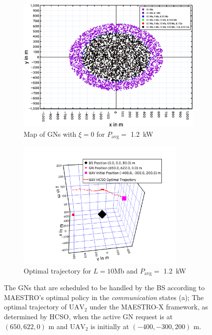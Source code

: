 \documentclass[12pt, draftcls, onecolumn]{IEEEtran}
\theoremstyle{plain}
\theoremstyle{definition}
\theoremstyle{remark}
\begin{document}
\begin{figure}
\centering
	\begin{subfigure}{0.49\textwidth}
  		\centering
  		\includegraphics[width=0.9\linewidth]{figs/GN_Distribution.png}
  		\caption{Map of GNs with $\xi{=}0$ for $P_{\mathrm{avg}}=$ \qty[mode=text]{1.2}{\kilo\watt}}
  		\label{F9}
	\end{subfigure}
	\begin{subfigure}{0.49\textwidth}
  		\centering
  		\includegraphics[width=0.9\textwidth]{figs/Trajectory.png}
		\caption{Optimal trajectory for $L{=}10$Mb and $P_{\mathrm{avg}}=$ \qty[mode=text]{1.2}{\kilo\watt}}
		\label{F10}
	\end{subfigure}
\caption{The GNs that are scheduled to be handled by the BS according to MAESTRO's optimal policy in the \emph{communication} states (a); The optimal trajectory of $\text{UAV}_{2}$ under the MAESTRO-X framework, as determined by HCSO, when the active GN request is at $(650,622,0)$ m and $\text{UAV}_{2}$ is initially at $(-400,-300,200)$ m.}
\label{F9andF10}
\vspace{-8mm}
\end{figure}
\end{document}
